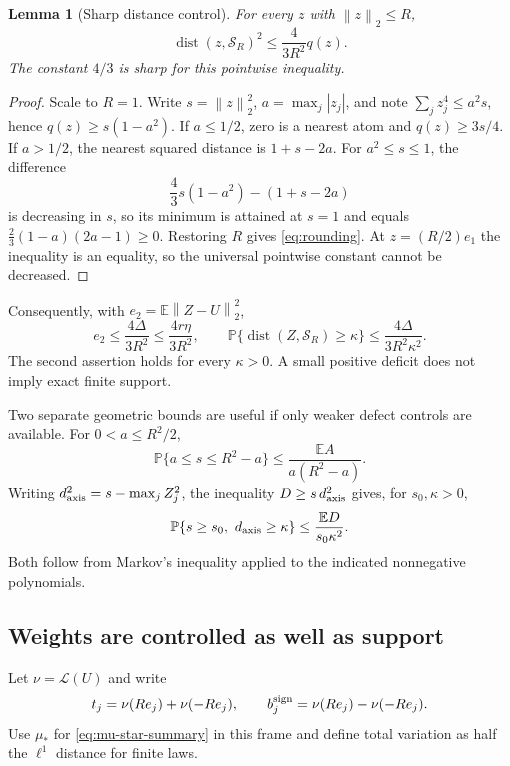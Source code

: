 \documentclass[11pt]{article}
\newtheorem{lemma}[theorem]{Lemma}
\theoremstyle{definition}
\theoremstyle{remark}
\newcommand{\E}{\mathbb E}
\newcommand{\Prob}{\mathbb P}
\newcommand{\dist}{\operatorname{dist}}
\newcommand{\Law}{\mathcal L}
\newcommand{\norm}[1]{\left\lVert#1\right\rVert}
\begin{document}
\begin{lemma}[Sharp distance control]
\label{lem:rounding}
For every $z$ with $\norm{z}_2\le R$,
\begin{equation}
\dist(z,\mathcal S_R)^2\le\frac4{3R^2}q(z).
\label{eq:rounding}
\end{equation}
The constant $4/3$ is sharp for this pointwise inequality.
\end{lemma}
\begin{proof}
Scale to $R=1$. Write $s=\norm{z}_2^2$, $a=\max_j|z_j|$, and note
$\sum_jz_j^4\le a^2s$, hence $q(z)\ge s(1-a^2)$.
If $a\le1/2$, zero is a nearest atom and $q(z)\ge3s/4$.
If $a>1/2$, the nearest squared distance is $1+s-2a$. For
$a^2\le s\le1$, the difference
\[
\frac43s(1-a^2)-(1+s-2a)
\]
is decreasing in $s$, so its minimum is attained at $s=1$ and equals
$\frac23(1-a)(2a-1)\ge0$. Restoring $R$ gives
\eqref{eq:rounding}. At $z=(R/2)e_1$ the inequality is an equality,
so the universal pointwise constant cannot be decreased.
\end{proof}

Consequently, with $e_2=\E\norm{Z-U}_2^2$,
\begin{equation}
e_2\le\frac{4\Delta}{3R^2}\le\frac{4r\eta}{3R^2},
\qquad
\Prob\{\dist(Z,\mathcal S_R)\ge\kappa\}
\le\frac{4\Delta}{3R^2\kappa^2}.
\label{eq:rounding-mean}
\end{equation}
The second assertion holds for every $\kappa>0$. A small positive deficit
does not imply exact finite support.

Two separate geometric bounds are useful if only weaker defect controls
are available. For $0<a\le R^2/2$,
\begin{equation}
\Prob\{a\le s\le R^2-a\}\le\frac{\E A}{a(R^2-a)}.
\label{eq:radial}
\end{equation}
Writing $d_{\rm axis}^2=s-\max_jZ_j^2$, the inequality
$D\ge s\,d_{\rm axis}^2$ gives, for $s_0,\kappa>0$,
\begin{equation}
\Prob\{s\ge s_0,\ d_{\rm axis}\ge\kappa\}
\le\frac{\E D}{s_0\kappa^2}.
\label{eq:angular}
\end{equation}
Both follow from Markov's inequality applied to the indicated nonnegative
polynomials.

\subsection{Weights are controlled as well as support}

Let $\nu=\Law(U)$ and write
\[
t_j=\nu(Re_j)+\nu(-Re_j),\qquad
b_j^{\rm sign}=\nu(Re_j)-\nu(-Re_j).
\]
Use $\mu_*$ for \eqref{eq:mu-star-summary} in this frame and define total
variation as half the $\ell^1$ distance for finite laws.
\end{document}
